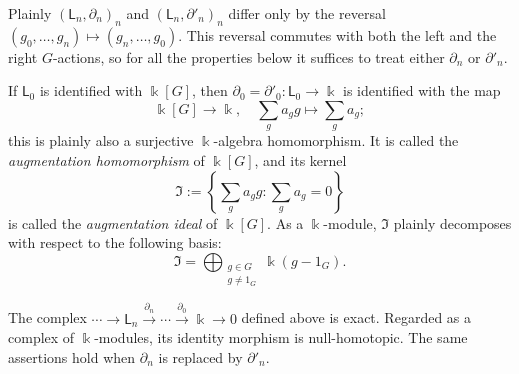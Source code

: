 Plainly $(\mathsf{L}_n,\partial_n)_n$ and
$(\mathsf{L}_n,\partial'_n)_n$ differ only by the reversal
$(g_0,\ldots,g_n)\mapsto(g_n,\ldots,g_0)$. This reversal commutes with both the
left and the right $G$-actions, so for all the properties below it suffices to
treat either $\partial_n$ or $\partial'_n$.

\begin{remark}\label{rem:augmentation-kG}
	If $\mathsf{L}_0$ is identified with $\Bbbk[G]$, then
	$\partial_0=\partial'_0:\mathsf{L}_0\to\Bbbk$ is identified with the map
	\[ \Bbbk[G] \to \Bbbk, \quad \sum_g a_g g \mapsto \sum_g a_g; \]
	this is plainly also a surjective $\Bbbk$-algebra homomorphism. It is called
	the \emph{augmentation homomorphism} of $\Bbbk[G]$, and its kernel
	\[ \mathfrak{I} := \left\{ \sum_g a_g g : \sum_g a_g = 0 \right\} \]
	is called the \emph{augmentation ideal} of $\Bbbk[G]$. As a $\Bbbk$-module,
	$\mathfrak{I}$ plainly decomposes with respect to the following basis:
	\[ \mathfrak{I} = \bigoplus_{\substack{g \in G \\ g \neq 1_G}} \Bbbk (g - 1_G). \]
\end{remark}

\begin{lemma}\label{prop:L-acyclic}
	The complex
	$\cdots\to\mathsf{L}_n\xrightarrow{\partial_n}\cdots
	\xrightarrow{\partial_0}\Bbbk\to0$ defined above is exact. Regarded as a
	complex of $\Bbbk$-modules, its identity morphism is null-homotopic. The
	same assertions hold when $\partial_n$ is replaced by $\partial'_n$.
\end{lemma}

